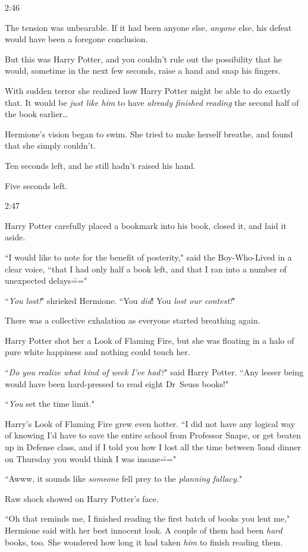 2:46\pm

The tension was unbearable. If it had been anyone else, \emph{anyone} else, his defeat would have been a foregone conclusion.

But this was Harry Potter, and you couldn't rule out the possibility that he would, sometime in the next few seconds, raise a hand and snap his fingers.

With sudden terror she realized how Harry Potter might be able to do exactly that. It would be \emph{just like him} to have \emph{already finished reading} the second half of the book earlier{\ldots}

Hermione's vision began to swim. She tried to make herself breathe, and found that she simply couldn't.

Ten seconds left, and he still hadn't raised his hand.

Five seconds left.

2:47\pm

Harry Potter carefully placed a bookmark into his book, closed it, and laid it aside.

``I would like to note for the benefit of posterity," said the Boy-Who-Lived in a clear voice, ``that I had only half a book left, and that I ran into a number of unexpected delays\==="

``\emph{You lost!}" shrieked Hermione. ``You \emph{did}! You \emph{lost our contest!}"

There was a collective exhalation as everyone started breathing again.

Harry Potter shot her a Look of Flaming Fire, but she was floating in a halo of pure white happiness and nothing could touch her.

``\emph{Do you realize what kind of week I've had?}" said Harry Potter. ``Any lesser being would have been hard-pressed to read eight Dr~Seuss books!"

``\emph{You} set the time limit."

Harry's Look of Flaming Fire grew even hotter. ``I did not have any logical way of knowing I'd have to save the entire school from Professor Snape, or get beaten up in Defense class, and if I told you how I lost all the time between 5\pm and dinner on Thursday you would think I was insane\==="

``Awww, it sounds like \emph{someone} fell prey to the \emph{planning fallacy.}"

Raw shock showed on Harry Potter's face.

``Oh that reminds me, I finished reading the first batch of books you lent me," Hermione said with her best innocent look. A couple of them had been \emph{hard} books, too. She wondered how long it had taken \emph{him} to finish reading them.


